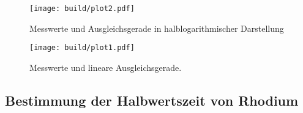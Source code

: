 
\begin{figure}[h]
  \centering
  \texttt{[image: build/plot2.pdf]}
  \caption{Messwerte und Ausgleichsgerade in halblogarithmischer Darstellung}
  \label{fig:plot2}
\end{figure}


\begin{figure}[h]
  \centering
  \texttt{[image: build/plot1.pdf]}
  \caption{Messwerte und lineare Ausgleichsgerade.}
  \label{fig:plot1}
\end{figure}

\newpage

\subsection{Bestimmung der Halbwertszeit von Rhodium}


